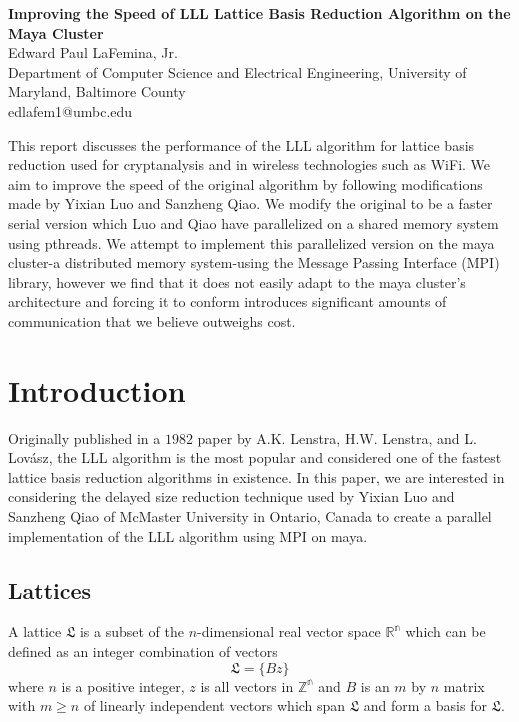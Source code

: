 \documentclass[12pt]{article}
\numberwithin{equation}{section}
\numberwithin{table}{section}
\numberwithin{figure}{section}
\begin{document}

\begin{center}
\textbf{\Large Improving the Speed of LLL Lattice Basis Reduction Algorithm on the Maya Cluster} \\[6pt]
  Edward Paul LaFemina, Jr. \\[6pt]
  Department of Computer Science and Electrical Engineering,
  University of Maryland, Baltimore County  \\[6pt]
  edlafem1@umbc.edu
\end{center}
\abstract This report discusses the performance of the LLL algorithm for lattice basis reduction used for cryptanalysis and in wireless technologies such as Wi\-Fi. We aim to improve the speed of the original algorithm by following modifications made by Yixian Luo and Sanzheng Qiao. We modify the original to be a faster serial version which Luo and Qiao have parallelized on a shared memory system using pthreads. We attempt to implement this parallelized version on the maya cluster-a distributed memory system-using the Message Passing Interface (MPI) library, however we find that it does not easily adapt to the maya cluster's architecture and forcing it to conform introduces significant amounts of communication that we believe outweighs cost.

\section{Introduction}
Originally published in a $1982$ paper by A.K. Lenstra, H.W. Lenstra, and L. Lov\'{a}sz, the LLL algorithm is the most popular and considered one of the fastest lattice basis reduction algorithms in existence. In this paper, we are interested in considering the delayed size reduction technique used by Yixian Luo and Sanzheng Qiao of McMaster University in Ontario, Canada to create a parallel implementation of the LLL algorithm using MPI on maya.

\subsection{Lattices}
A lattice $\mathfrak{L}$ is a subset of the $n$-dimensional real vector space $\mathbb{R^n}$ which can be defined as an integer combination of vectors
$$\mathfrak{L}=\{Bz\}$$
where $n$ is a positive integer, $z$ is all vectors in $\mathbb{Z^n}$ and $B$ is an $m$ by $n$ matrix with $m\geq n$ of linearly independent vectors which span $\mathfrak{L}$ and form a basis for $\mathfrak{L}$.
\end{document}
